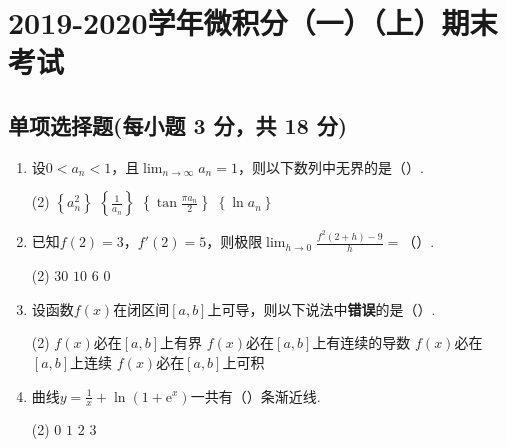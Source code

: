 \documentclass[../main.tex]{subfiles}
\begin{document}
\chapter{2019-2020学年微积分（一）（上）期末考试}

\section{单项选择题(每小题 3 分，共 18 分)}
\begin{enumerate}
    \item 设$0<a_{n}<1$，且$\lim_{n\to\infty}a_{n}=1$，则以下数列中无界的是（\qquad）.

          \begin{tasks}[label=\textbf{\Alph*.}, label-width=1.5em, column-sep=1em](2)
              \task $\left\{a_{n}^{2}\right\}$
              \task $\left\{\frac{1}{a_{n}}\right\}$
              \task $\left\{\tan\frac{\pi a_{n}}{2}\right\}$
              \task $\left\{\ln a_{n}\right\}$
          \end{tasks}

    \item 已知$f(2)=3$，$f'(2)=5$，则极限$\lim_{h\to0}\frac{f^{2}(2+h)-9}{h}=$（\qquad）.

          \begin{tasks}[label=\textbf{\Alph*.}, label-width=1.5em, column-sep=1em](2)
              \task $30$
              \task $10$
              \task $6$
              \task $0$
          \end{tasks}

    \item 设函数$f(x)$在闭区间$[a,b]$上可导，则以下说法中\textbf{错误}的是（\qquad）.

          \begin{tasks}[label=\textbf{\Alph*.}, label-width=1.5em, column-sep=1em](2)
              \task $f(x)$必在$[a,b]$上有界
              \task $f(x)$必在$[a,b]$上有连续的导数
              \task $f(x)$必在$[a,b]$上连续
              \task $f(x)$必在$[a,b]$上可积
          \end{tasks}

    \item 曲线$y=\frac{1}{x}+\ln\left(1+\mathrm{e}^{x}\right)$一共有（\qquad）条渐近线.

          \begin{tasks}[label=\textbf{\Alph*.}, label-width=1.5em, column-sep=1em](2)
              \task $0$
              \task $1$
              \task $2$
              \task $3$
          \end{tasks}


\end{enumerate}
\end{document}
